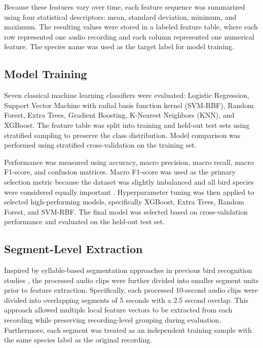 \documentclass[runningheads]{llncs}
\begin{document}
Because these features vary over time, each feature sequence was summarized using four statistical descriptors: mean, standard deviation, minimum, and maximum. The resulting values were stored in a labeled feature table, where each row represented one audio recording and each column represented one numerical feature. The species name was used as the target label for model training.

\subsection{Model Training}

Seven classical machine learning classifiers were evaluated: Logistic Regression, Support Vector Machine with radial basis function kernel (SVM-RBF), Random Forest, Extra Trees, Gradient Boosting, K-Nearest Neighbors (KNN), and XGBoost. The feature table was split into training and held-out test sets using stratified sampling to preserve the class distribution. Model comparison was performed using stratified cross-validation on the training set.

Performance was measured using accuracy, macro precision, macro recall, macro F1-score, and confusion matrices. Macro F1-score was used as the primary selection metric because the dataset was slightly imbalanced and all bird species were considered equally important \cite{sklearn_f1}. Hyperparameter tuning was then applied to selected high-performing models, specifically XGBoost, Extra Trees, Random Forest, and SVM-RBF. The final model was selected based on cross-validation performance and evaluated on the held-out test set.


\subsection{Segment-Level Extraction}

Inspired by syllable-based segmentation approaches in previous bird recognition studies \cite{fagerlund2007}, the processed audio clips were further divided into smaller segment units prior to feature extraction. Specifically, each processed 10-second audio clips were divided into overlapping segments of 5 seconds with a 2.5 second overlap. This approach allowed multiple local feature vectors to be extracted from each recording while preserving recording-level grouping during evaluation. Furthermore, each segment was treated as an independent training sample with the same species label as the original recording.
\end{document}

